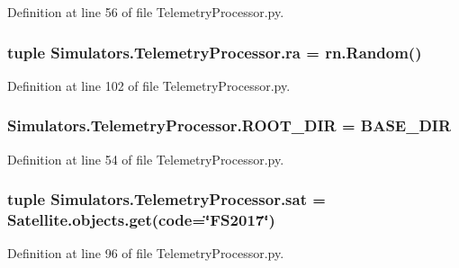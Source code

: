 Definition at line 56 of file Telemetry\+Processor.\+py.

\hypertarget{namespace_simulators_1_1_telemetry_processor_aba1ed44c3244daa9240167e6b3b375b4}{}
\subsubsection[{ra}]{\setlength{\rightskip}{0pt plus 5cm}tuple Simulators.\+Telemetry\+Processor.\+ra = rn.\+Random()}\label{namespace_simulators_1_1_telemetry_processor_aba1ed44c3244daa9240167e6b3b375b4}


Definition at line 102 of file Telemetry\+Processor.\+py.

\hypertarget{namespace_simulators_1_1_telemetry_processor_a8c49f30b06ce8e1d4f1cb129990137f0}{}
\subsubsection[{R\+O\+O\+T\+\_\+\+D\+I\+R}]{\setlength{\rightskip}{0pt plus 5cm}Simulators.\+Telemetry\+Processor.\+R\+O\+O\+T\+\_\+\+D\+I\+R = B\+A\+S\+E\+\_\+\+D\+I\+R}\label{namespace_simulators_1_1_telemetry_processor_a8c49f30b06ce8e1d4f1cb129990137f0}


Definition at line 54 of file Telemetry\+Processor.\+py.

\hypertarget{namespace_simulators_1_1_telemetry_processor_a0853713b806ec7ae27394839316688a4}{}
\subsubsection[{sat}]{\setlength{\rightskip}{0pt plus 5cm}tuple Simulators.\+Telemetry\+Processor.\+sat = Satellite.\+objects.\+get(code=\char`\"{}F\+S2017\char`\"{})}\label{namespace_simulators_1_1_telemetry_processor_a0853713b806ec7ae27394839316688a4}


Definition at line 96 of file Telemetry\+Processor.\+py.


